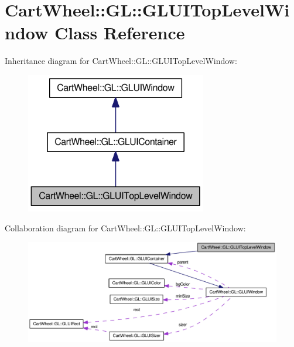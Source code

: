 \hypertarget{classCartWheel_1_1GL_1_1GLUITopLevelWindow}{
\section{CartWheel::GL::GLUITopLevelWindow Class Reference}
\label{classCartWheel_1_1GL_1_1GLUITopLevelWindow}
}


Inheritance diagram for CartWheel::GL::GLUITopLevelWindow:\nopagebreak
\begin{figure}[H]
\begin{center}
\leavevmode
\includegraphics[width=224pt]{classCartWheel_1_1GL_1_1GLUITopLevelWindow__inherit__graph}
\end{center}
\end{figure}


Collaboration diagram for CartWheel::GL::GLUITopLevelWindow:\nopagebreak
\begin{figure}[H]
\begin{center}
\leavevmode
\includegraphics[width=400pt]{classCartWheel_1_1GL_1_1GLUITopLevelWindow__coll__graph}
\end{center}
\end{figure}
